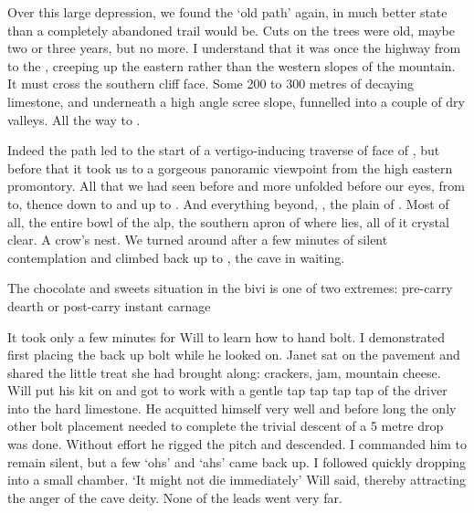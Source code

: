 Over this large depression, we found the `old  path' again, in much better state than a completely abandoned trail would be. Cuts on the trees were old, maybe two or three years, but no more. I understand that it was once the highway from  to the , creeping up the eastern rather than the western slopes of the mountain. It must cross the  southern cliff face. Some 200 to 300 metres of decaying limestone, and underneath a high angle scree slope, funnelled into a couple of dry valleys. All the way to . 

Indeed the path led to the start of a vertigo-inducing traverse of face of , but before that it took us to a gorgeous panoramic viewpoint from the high eastern promontory. All that we had seen before and more unfolded before our eyes, from  to, thence down to  and up to . And everything beyond, , the plain of . Most of all, the entire bowl of the  alp, the southern apron of  where  lies, all of it crystal clear. A crow's nest. We turned around after a few minutes of silent contemplation and climbed back up to , the cave in waiting. 

\begin{marginfigure}
\centering
{}
\label{chocolate}
\caption{The chocolate and sweets situation in the bivi is one of two extremes: pre-carry dearth or post-carry instant carnage }
\end{marginfigure}

It took only a few minutes for Will to learn how to hand bolt. I demonstrated first placing the back up bolt while he looked on. Janet sat on the pavement and shared the little treat she had brought along: crackers, jam, mountain cheese. Will put his kit on and got to work with a gentle tap tap tap tap  of the driver into the hard limestone. He acquitted himself very well and before long the only other bolt placement needed to complete the trivial descent of a 5 metre drop was done. Without effort he rigged the pitch and descended. I commanded him to remain silent, but a few `ohs' and `ahs' came back up. I followed quickly dropping into a small chamber.
`It might not die immediately' Will said, thereby attracting the anger of the cave deity. None of the leads went very far. 




